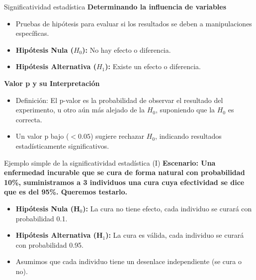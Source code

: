 ﻿\documentclass{beamer}
\begin{document}
\begin{frame}{Significatividad estadística}
    \textbf{Determinando la influencia de variables}
    \begin{itemize}
        \item Pruebas de hipótesis para evaluar si los resultados se deben a manipulaciones específicas.
        \item \textbf{Hipótesis Nula ($H_0$):} No hay efecto o diferencia.
        \item \textbf{Hipótesis Alternativa ($H_1$):} Existe un efecto o diferencia.
    \end{itemize}

    \textbf{Valor p y su Interpretación}
    \begin{itemize}
        \item Definición: El p-valor es la probabilidad de observar el resultado del experimento, u otro aún más alejado de la $H_0$, suponiendo que la $H_0$ es correcta.
        \item Un valor p bajo ($<0.05$) sugiere rechazar $H_0$, indicando resultados estadísticamente significativos.
    \end{itemize}
\end{frame}


\begin{frame}{Ejemplo simple de la significatividad estadística (I)}
\textbf{Escenario: Una enfermedad incurable que se cura de forma natural con probabilidad 10\%, suministramos a 3 individuos una cura cuya efectividad se dice que es del 95\%. Queremos testarlo.}
\begin{itemize}
    \item \textbf{Hipótesis Nula (H$_0$):} La cura no tiene efecto, cada individuo se curará con probabilidad 0.1.
    \item \textbf{Hipótesis Alternativa (H$_1$):} La cura es válida, cada individuo se curará con probabilidad 0.95.
    \item Asumimos que cada individuo tiene un desenlace independiente (se cura o no).
\end{itemize}
\end{frame}
\end{document}
